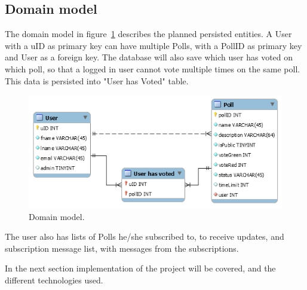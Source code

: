 \subsection{Domain model}
\label{sub:domainmodel}
The domain model in figure~\ref{fig:domainmodel} describes the planned persisted entities. A User with a uID as primary key can have multiple Polls, with a PollID as primary key and User as a foreign key. The database will also save which user has voted on which poll, so that a logged in user cannot vote multiple times on the same poll. This data is persisted into "User has Voted" table.
\begin{figure}[H]
  \centering
  \includegraphics[scale=0.5]{figs/domainmodel.png}
  \caption[scale=0.5]{Domain model.}
  \label{fig:domainmodel}
\end{figure}

The user also has lists of Polls he/she subscribed to, to receive updates, and subscription message list, with messages from the subscriptions.

\par\noindent In the next section implementation of the project will be covered, and the different technologies used.